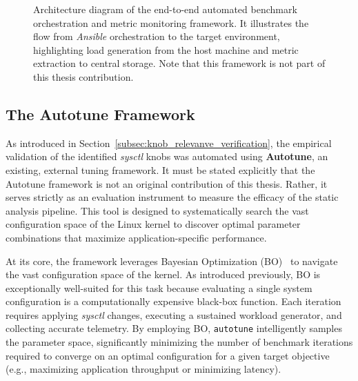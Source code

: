 \begin{figure}[htbp]
    \caption{Architecture diagram of the end-to-end automated benchmark orchestration and metric monitoring framework. It illustrates the flow from \textit{Ansible} orchestration to the target environment, highlighting load generation from the host machine and metric extraction to central storage. Note that this framework is not part of this thesis contribution.}
    \label{fig:metric_monitoring_architecture}
\end{figure}

\subsection{The Autotune Framework}

As introduced in Section~\ref{subsec:knob_relevanve_verification}, the empirical validation of the identified \textit{sysctl} knobs was automated using \textbf{Autotune}, an existing, external tuning framework.
It must be stated explicitly that the Autotune framework is not an original contribution of this thesis.
Rather, it serves strictly as an evaluation instrument to measure the efficacy of the static analysis pipeline.
This tool is designed to systematically search the vast configuration space of the Linux kernel to discover optimal parameter combinations that maximize application-specific performance.

At its core, the framework leverages Bayesian Optimization (BO)~\cite{bayesian_process} to navigate the vast configuration space of the kernel.
As introduced previously, BO is exceptionally well-suited for this task because evaluating a single system configuration is a computationally expensive black-box function.
Each iteration requires applying \textit{sysctl} changes, executing a sustained workload generator, and collecting accurate telemetry.
By employing BO, \texttt{autotune} intelligently samples the parameter space, significantly minimizing the number of benchmark iterations required to converge on an optimal configuration for a given target objective (e.g., maximizing application throughput or minimizing latency).

